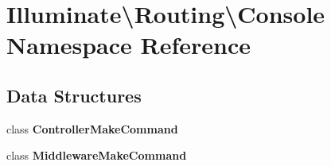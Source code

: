 \section{Illuminate\textbackslash{}Routing\textbackslash{}Console Namespace Reference}
\label{namespace_illuminate_1_1_routing_1_1_console}
\subsection*{Data Structures}
\begin{DoxyCompactItemize}
\item 
class {\bf Controller\+Make\+Command}
\item 
class {\bf Middleware\+Make\+Command}
\end{DoxyCompactItemize}
